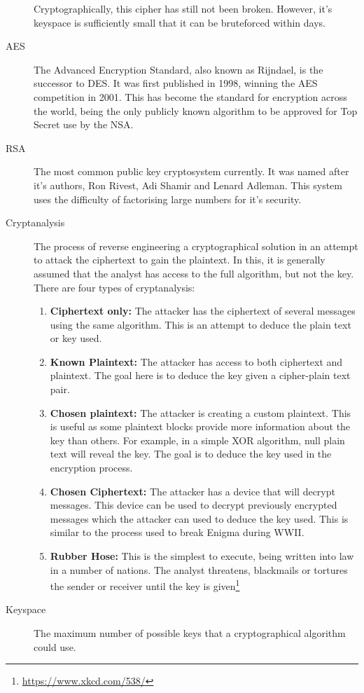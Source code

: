\begin{description}
					Cryptographically, this cipher has still not been broken. 
					However, it's keyspace is sufficiently small that it can be bruteforced within days. 
				\item[AES] The Advanced Encryption Standard, also known as Rijndael, is the successor to DES. 
					It was first published in 1998, winning the AES competition in 2001. 
					This has become the standard for encryption across the world, being the only publicly known algorithm to be approved for Top Secret use by the NSA. 
				\item[RSA] The most common public key cryptosystem currently. 
					It was named after it's authors, Ron Rivest, Adi Shamir and Lenard Adleman. 
					This system uses the difficulty of factorising large numbers for it's security.
				\item[Cryptanalysis] The process of reverse engineering a cryptographical solution in an attempt to attack the ciphertext to gain the plaintext. 
					In this, it is generally assumed that the analyst has access to the full algorithm, but not the key. 
					There are four types of cryptanalysis: 
					\begin{enumerate}
						\item \textbf{Ciphertext only:} The attacker has the ciphertext of several messages using the same algorithm. 
							This is an attempt to deduce the plain text or key used. 
						\item \textbf{Known Plaintext:} The attacker has access to both ciphertext and plaintext. 
							The goal here is to deduce the key given a cipher-plain text pair. 
						\item \textbf{Chosen plaintext:} The attacker is creating a custom plaintext. 
							This is useful as some plaintext blocks provide more information about the key than others. 
							For example, in a simple XOR algorithm, null plain text will reveal the key. 
							The goal is to deduce the key used in the encryption process. 
						\item \textbf{Chosen Ciphertext:} The attacker has a device that will decrypt messages. 
							This device can be used to decrypt previously encrypted messages which the attacker can used to deduce the key used. 
							This is similar to the process used to break Enigma during WWII. 
						\item \textbf{Rubber Hose:} This is the simplest to execute, being written into law in a number of nations.
							The analyst threatens, blackmails or tortures the sender or receiver until the key is given\footnote{\url{https://www.xkcd.com/538/}}
					\end{enumerate}
				\item[Keyspace] The maximum number of possible keys that a cryptographical algorithm could use. 
			\end{description}
